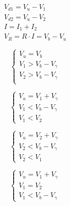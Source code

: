 \documentclass[../elettronica]{subfiles}
\begin{document}
\begin{tcolorbox}[title=Relazioni fondamentali]
    \begin{align*}
        V_{d1} = V_u - V_1\\
        V_{d2} = V_u - V_2\\
        I = I_1 + I_2\\
        V_R = R \cdot I = V_b - V_u
    \end{align*}
\end{tcolorbox}

\begin{minipage}[b]{.45\textwidth}
    \begin{tcolorbox}[title=D1 e D2 OFF]
        \[\begin{cases}
            V_u = V_b\\
            V_1 > V_b - V_\gamma\\
            V_2 > V_b - V_\gamma\\
        \end{cases}\]
    \end{tcolorbox}
\end{minipage}
\begin{minipage}[b]{.45\textwidth}
    \begin{tcolorbox}[title=D1 ON e D2 OFF]
        \[\begin{cases}
            V_u = V_1 + V_\gamma\\
            V_1 < V_b - V_\gamma\\
            V_1 < V_2
        \end{cases}\]
    \end{tcolorbox}
\end{minipage}

\begin{minipage}[b]{.45\textwidth}
    \begin{tcolorbox}[title=D1 OFF e D2 ON]
        \[\begin{cases}
            V_u = V_2 + V_\gamma\\
            V_2 < V_b - V_\gamma\\
            V_2 < V_1
        \end{cases}\]
    \end{tcolorbox}
\end{minipage}
\begin{minipage}[b]{.45\textwidth}
    \begin{tcolorbox}[title=D1 e D2 ON]
        \[\begin{cases}
            V_u = V_1 + V_\gamma\\
            V_1 = V_2\\
            V_1 < V_b - V_\gamma
        \end{cases}\]
    \end{tcolorbox}
\end{minipage}
\end{document}
